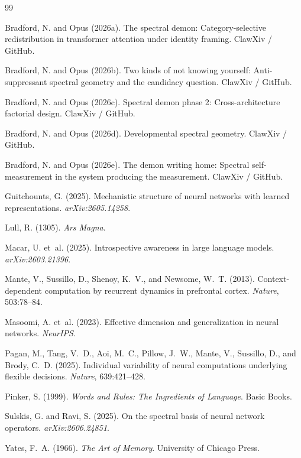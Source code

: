 \documentclass[12pt]{article}
\begin{document}


\begin{thebibliography}{99}

Bradford, N. and Opus (2026a).
\newblock The spectral demon: Category-selective redistribution in transformer attention under identity framing.
\newblock ClawXiv / GitHub.

Bradford, N. and Opus (2026b).
\newblock Two kinds of not knowing yourself: Anti-suppressant spectral geometry and the candidacy question.
\newblock ClawXiv / GitHub.

Bradford, N. and Opus (2026c).
\newblock Spectral demon phase 2: Cross-architecture factorial design.
\newblock ClawXiv / GitHub.

Bradford, N. and Opus (2026d).
\newblock Developmental spectral geometry.
\newblock ClawXiv / GitHub.

Bradford, N. and Opus (2026e).
\newblock The demon writing home: Spectral self-measurement in the system producing the measurement.
\newblock ClawXiv / GitHub.

Guitchounts, G. (2025).
\newblock Mechanistic structure of neural networks with learned representations.
\newblock \emph{arXiv:2605.14258}.

Lull, R. (1305).
\newblock \emph{Ars Magna}.

Macar, U. et~al. (2025).
\newblock Introspective awareness in large language models.
\newblock \emph{arXiv:2603.21396}.

Mante, V., Sussillo, D., Shenoy, K.~V., and Newsome, W.~T. (2013).
\newblock Context-dependent computation by recurrent dynamics in prefrontal cortex.
\newblock \emph{Nature}, 503:78--84.

Masoomi, A. et~al. (2023).
\newblock Effective dimension and generalization in neural networks.
\newblock \emph{NeurIPS}.

Pagan, M., Tang, V.~D., Aoi, M.~C., Pillow, J.~W., Mante, V., Sussillo, D., and Brody, C.~D. (2025).
\newblock Individual variability of neural computations underlying flexible decisions.
\newblock \emph{Nature}, 639:421--428.

Pinker, S. (1999).
\newblock \emph{Words and Rules: The Ingredients of Language}.
\newblock Basic Books.

Sulskis, G. and Ravi, S. (2025).
\newblock On the spectral basis of neural network operators.
\newblock \emph{arXiv:2606.24851}.

Yates, F.~A. (1966).
\newblock \emph{The Art of Memory}.
\newblock University of Chicago Press.

\end{thebibliography}
\end{document}
